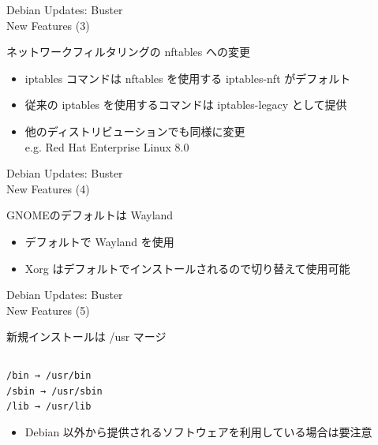 \documentclass[cjk,c,squeeze,shrink,dvipdfmx,12pt]{beamer}
\begin{document}
\begin{frame}[fragile]{%
    Debian Updates: Buster%
    \\[-.5em]{\normalsize{New Features (3)}}
  }

  ネットワークフィルタリングの nftables への変更

  \begin{itemize}
  \item iptables コマンドは nftables を使用する iptables-nft がデフォルト
  \item 従来の iptables を使用するコマンドは iptables-legacy として提供
  \item 他のディストリビューションでも同様に変更\\
    e.g. Red Hat Enterprise Linux 8.0
  \end{itemize}
\end{frame}

\begin{frame}[fragile]{%
    Debian Updates: Buster%
    \\[-.5em]{\normalsize{New Features (4)}}
  }

  GNOMEのデフォルトは Wayland

  \begin{itemize}
  \item デフォルトで Wayland を使用
  \item Xorg はデフォルトでインストールされるので切り替えて使用可能
  \end{itemize}
\end{frame}

\begin{frame}[fragile]{%
    Debian Updates: Buster%
    \\[-.5em]{\normalsize{New Features (5)}}
  }

  新規インストールは /usr マージ

\begin{verbatim}
\end{verbatim}
  \begin{center}
    {\Huge{
        \texttt{/bin → /usr/bin}\\
        \texttt{/sbin → /usr/sbin}\\
        \texttt{/lib → /usr/lib}\\
    }}
  \end{center}

  \begin{itemize}
  \item Debian 以外から提供されるソフトウェアを利用している場合は要注意
  \end{itemize}
\end{frame}
\end{document}
